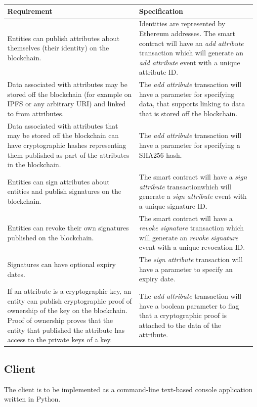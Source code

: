 \documentclass[a4paper]{report}
\begin{document}
	\noindent \begin{longtable}{|p{5.5cm}|p{5.5cm}|}
		\hline
		\textbf{Requirement} & \textbf{Specification} \\ \hline
		Entities can publish attributes about themselves (their identity) on the blockchain. & Identities are represented by Ethereum addresses. The smart contract will have an \textit{add attribute} transaction which will generate an \textit{add attribute} event with a unique attribute ID. \\ \hline
		Data associated with attributes may be stored off the blockchain (for example on IPFS or any arbitrary URI) and linked to from attributes. & The \textit{add attribute} transaction will have a parameter for specifying data, that supports linking to data that is stored off the blockchain. \\ \hline
		Data associated with attributes that may be stored off the blockchain can have cryptographic hashes representing them published as part of the attributes in the blockchain. & The \textit{add attribute} transaction will have a parameter for specifying a SHA256 hash. \\ \hline
		Entities can sign attributes about entities and publish signatures on the blockchain. & The smart contract will have a \textit{sign attribute} transactionwhich will generate a \textit{sign attribute} event with a unique signature ID. \\ \hline
		Entities can revoke their own signatures published on the blockchain. & The smart contract will have a \textit{revoke signature} transaction which will generate an \textit{revoke signature} event with a unique revocation ID. \\ \hline
		Signatures can have optional expiry dates. & The \textit{sign attribute} transaction will have a parameter to specify an expiry date. \\ \hline
		If an attribute is a cryptographic key, an entity can publish cryptographic proof of ownership of the key on the blockchain. Proof of ownership proves that the entity that published the attribute has access to the private keys of a key. & The \textit{add attribute} transaction will have a boolean parameter to flag that a cryptographic proof is attached to the data of the attribute. \\ \hline
	\end{longtable}
	
	\subsection{Client}
	The client is to be implemented as a command-line text-based console application written in Python.
	
\end{document}
